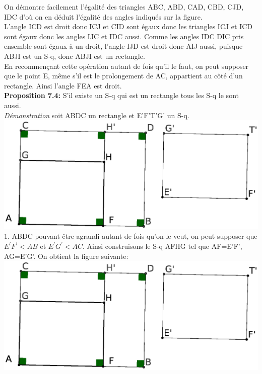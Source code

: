 \documentclass[a4paper, 12pt, twoside]{book}
\begin{document}
   On démontre facilement l'égalité des triangles ABC, ABD, CAD, CBD, CJD, IDC d'où on en déduit l'égalité des angles indiqués sur la figure.\\
   
  
  
   
   L'angle ICD est droit donc ICJ et CID sont égaux donc les triangles ICJ et ICD sont égaux donc les angles IJC et IDC aussi. Comme les angles IDC DIC pris ensemble sont égaux à un droit, l'angle IJD est droit donc AIJ aussi, puisque ABJI est un S-q, donc  ABJI est un rectangle.\\
   
   En recommençant cette opération autant de fois qu'il le faut, on peut supposer que le point E, même s'il est le prolongement de AC, appartient au côté d'un rectangle. Ainsi l'angle FEA est droit.\\
   
 \textbf{Proposition 7.4:} S'il existe un S-q qui est un rectangle tous les S-q le sont aussi.\\

\textit{Démonstration} soit ABDC un rectangle et E'F'T'G' un S-q.\\

 \includegraphics[scale=0.7]{figures/saccheri6.eps}\\

1. ABDC pouvant être agrandi autant de fois qu'on le veut, on peut supposer que    $E^{'}F^{'}<AB$ et $E^{'}G^{'}<AC$. Ainsi construisons le S-q AFHG tel que AF=E'F', AG=E'G'. On obtient la figure suivante:\\

  \includegraphics[scale=0.7]{figures/saccheri6.eps}\\   
   
\end{document}
